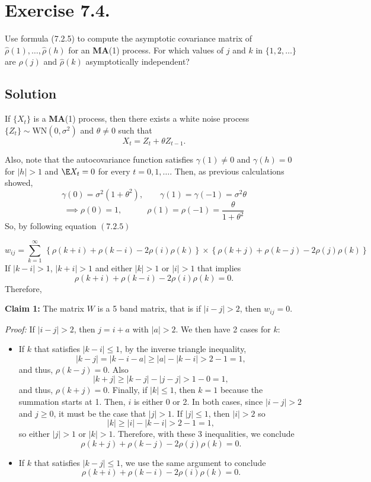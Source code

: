 \section*{Exercise 7.4.}


Use formula (7.2.5) to compute the asymptotic covariance matrix of $\hat{\rho} ( 1 ), \ldots, \hat{\rho} ( h )$ for an \textbf{MA}(1) process. For which values of $j$ and $k$ in $\{1, 2, \ldots\}$ are $\hat{\rho} ( j )$ and $\hat{\rho} ( k )$ asymptotically independent?

\subsection*{Solution}

If $\{X_t\}$ is a \textbf{MA}(1) process, then there exists a white noise process $\{Z_t\} \sim \text{WN}(0,\sigma^2)$ and $\theta \neq 0$ such that
\[ X_t = Z_t + \theta Z_{t-1}.\]

Also, note that the autocovariance function satisfies $\gamma(1) \neq 0$ and $\gamma(h) = 0$ for $|h| > 1$ and $\E X_t = 0$ for every $t = 0,1,\ldots$. Then, as previous calculations showed,
\[ \gamma(0) = \sigma^2 (1+\theta^2),\hspace{2em} \gamma(1) = \gamma(-1) = \sigma^2 \theta\]
\[ \implies \rho(0) = 1,\hspace{3em} \rho(1) = \rho(-1) = \frac{\theta}{1+\theta^2} \]
So, by following equation $(7.2.5)$

\[ w_{i j}=\sum_{k=1}^{\infty}\,\left\{\rho(k+i)+\rho(k-i)-2\rho(i)\rho(k)\right\} \times \left\{ \rho(k+j)+\rho(k-j)-2\rho(j)\rho(k) \right\} \]
If $|k-i| > 1$, $|k+i| > 1$ and either $|k| > 1$ or $|i| > 1$ that implies
\[ \rho(k+i)+\rho(k-i)-2\rho(i)\rho(k) = 0. \]
Therefore, 

\textbf{Claim 1:} The matrix $W$ is a 5 band matrix, that is if $|i-j| > 2$, then $w_{ij} = 0$.

\textit{Proof:} If $|i - j| > 2$, then $j = i + a$ with $|a| > 2$. We then have 2 cases for $k$:

\begin{itemize}
    \item If $k$ that satisfies $|k-i| \leq 1$, by the inverse triangle inequality,
    \[ |k-j| = |k-i-a| \geq |a| - |k-i| > 2-1 = 1, \]
    and thus, $\rho(k-j) = 0$. Also
    \[ |k+j| \geq |k-j|-|j-j| > 1-0 = 1, \]
    and thus, $\rho(k+j) = 0$. Finally, if $|k| \leq 1$, then $k = 1$ because the summation starts at 1. Then, $i$ is either 0 or 2. In both cases, since $|i-j| > 2$ and $j\geq 0$, it must be the case that $|j| > 1$. If $|j|\leq 1$, then $|i| > 2$ so
    \[ |k| \geq |i|-|k-i| > 2-1 = 1, \]
    so either $|j| > 1$ or $|k| > 1$. Therefore, with these 3 inequalities, we conclude
    \[  \rho(k+j)+\rho(k-j)-2\rho(j)\rho(k) = 0. \]
    \item If $k$ that satisfies $|k-j| \leq 1$, we use the same argument to conclude
    \[ \rho(k+i)+\rho(k-i)-2\rho(i)\rho(k) = 0. \]
\end{itemize}

